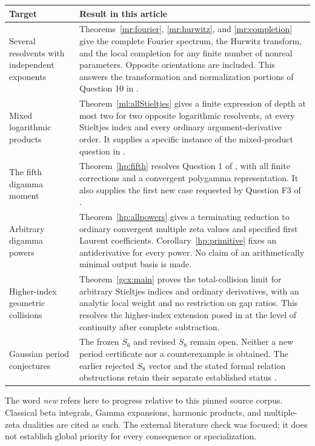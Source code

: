\documentclass[11pt]{article}
\numberwithin{equation}{section}
\theoremstyle{plain}
\theoremstyle{definition}
\theoremstyle{remark}
\begin{document}
\begin{longtable}{>{\raggedright\arraybackslash}p{}
                  >{\raggedright\arraybackslash}p{}}
\toprule
Target & Result in this article\\
\midrule
\endhead
Several resolvents with independent exponents &
Theorems~\ref{mr:fourier}, \ref{mr:hurwitz}, and \ref{mr:completion}
give the complete Fourier spectrum, the Hurwitz transform, and the
local completion for any finite number of nonreal parameters. Opposite
orientations are included. This answers the transformation and
normalization portions of Question 10 in \cite{repo:quartic}.\\[5pt]
Mixed logarithmic products &
Theorem~\ref{ml:allStieltjes} gives a finite expression of depth at
most two for two opposite logarithmic resolvents, at every Stieltjes
index and every ordinary argument-derivative order. It supplies a
specific instance of the mixed-product question in \cite{repo:quartic}.\\[5pt]
The fifth digamma moment &
Theorem~\ref{hp:fifth} resolves Question 1 of
\cite{repo:quartic}, with all finite corrections and a convergent
polygamma representation. It also supplies the first new case requested
by Question F3 of \cite{repo:barnes}.\\[5pt]
Arbitrary digamma powers &
Theorem~\ref{hp:allpowers} gives a terminating reduction to ordinary
convergent multiple zeta values and specified first Laurent coefficients.
Corollary~\ref{hp:primitive} fixes an antiderivative for every power.
No claim of an arithmetically minimal output basis is made.\\[5pt]
Higher-index geometric collisions &
Theorem~\ref{gcx:main} proves the total-collision limit for arbitrary
Stieltjes indices and ordinary derivatives, with an analytic local
weight and no restriction on gap ratios. This resolves the higher-index
extension posed in \cite{repo:reflection} at the level of continuity
after complete subtraction.\\[5pt]
Gaussian period conjectures &
The frozen $S_6$ and revised $S_8$ remain open. Neither a new period
certificate nor a counterexample is obtained. The earlier rejected
$S_8$ vector and the stated formal relation obstructions retain their
separate established status \cite{repo:main,repo:exact}.\\
\bottomrule
\end{longtable}

The word \emph{new} refers here to progress relative to this
pinned source corpus. Classical beta integrals, Gamma expansions,
harmonic products, and multiple-zeta dualities are cited as such.
The external literature check was focused; it does not establish global
priority for every consequence or specialization.
\end{document}
